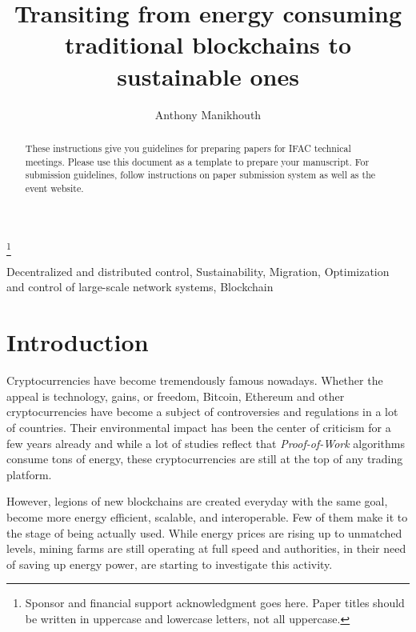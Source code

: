 \documentclass{ifacconf}
\begin{document}
\begin{frontmatter}

\title{Transiting from energy consuming traditional blockchains to sustainable ones} 

\thanks[footnoteinfo]{Sponsor and financial support acknowledgment
goes here. Paper titles should be written in uppercase and lowercase
letters, not all uppercase.}

\author[First]{Anthony Manikhouth}

\address[First]{EFREI Paris, 30 Av. de la République, 94800 Villejuif (e-mail: anthony.manikhouth@efrei.net).}

\begin{abstract}                %
These instructions give you guidelines for preparing papers for IFAC
technical meetings. Please use this document as a template to prepare
your manuscript. For submission guidelines, follow instructions on
paper submission system as well as the event website.
\end{abstract}

\begin{keyword}
Decentralized and distributed control, Sustainability, Migration, Optimization and control of large-scale network systems, Blockchain
\end{keyword}

\end{frontmatter}

\section{Introduction}
Cryptocurrencies have become tremendously famous nowadays. Whether the appeal is technology, gains, or freedom, Bitcoin, Ethereum and other cryptocurrencies have become a subject of controversies and regulations in a lot of countries. Their environmental impact has been the center of criticism for a few years already and while a lot of studies reflect that \textit{Proof-of-Work} algorithms consume tons of energy, these cryptocurrencies are still at the top of any trading platform. 

However, legions of new blockchains are created everyday with the same goal,  become more energy efficient, scalable, and interoperable. Few of them make it to the stage of being actually used. While energy prices are rising up to unmatched levels, mining farms are still operating at full speed and authorities, in their need of saving up energy power, are starting to investigate this activity.  
\end{document}
